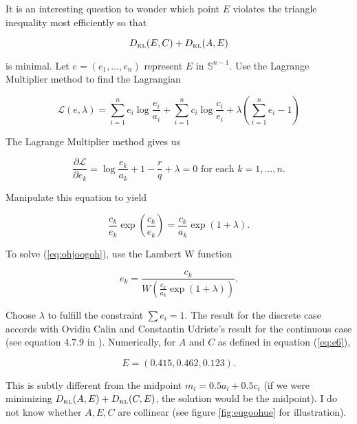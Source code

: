 \documentclass[11pt]{article}
\begin{document}
It is an interesting question to wonder which point $E$ violates the
triangle inequality most efficiently so that

\begin{equation}
  \label{eq:eaghaidu}
D_{\mbox{\tiny KL}}(E,C)+D_{\mbox{\tiny KL}}(A,E)  
\end{equation}

is minimal. Let $e=(e_{1},\ldots,e_{n})$ represent $E$ in
$\mathbb{S}^{n-1}$. Use the Lagrange Multiplier method to find the
Lagrangian

\begin{equation}
  \label{eq:eiweehee}
  \mathcal{L}(e,\lambda)=\sum_{i=1}^{n}e_{i}\log\frac{e_{i}}{a_{i}}+\sum_{i=1}^{n}c_{i}\log\frac{c_{i}}{e_{i}}+\lambda\left(\sum_{i=1}^{n}e_{i}-1\right)
\end{equation}

The Lagrange Multiplier method gives us

\begin{equation}
  \label{eq:nainguji}
  \frac{\partial\mathcal{L}}{\partial{}e_{k}}=\log\frac{e_{k}}{a_{k}}+1-\frac{r}{q}+\lambda=0\mbox{ for each }k=1,{\ldots},n.
\end{equation}

Manipulate this equation to yield

\begin{equation}
  \label{eq:ohjoogoh}
  \frac{c_{k}}{e_{k}}\exp\left(\frac{c_{k}}{e_{k}}\right)=\frac{c_{k}}{a_{k}}\exp(1+\lambda).
\end{equation}

To solve (\ref{eq:ohjoogoh}), use the Lambert W function

\begin{equation}
  \label{eq:ouquuzoh}
  e_{k}=\frac{c_{k}}{W\left(\frac{c_{k}}{a_{k}}\exp(1+\lambda)\right)}.
\end{equation}

Choose $\lambda$ to fulfill the constraint $\sum{}e_{i}=1$. The
result for the discrete case accords with Ovidiu Calin and Constantin
Udriste's result for the continuous case (see equation 4.7.9 in
). Numerically, for $A$ and $C$ as
defined in equation (\ref{eq:e6}),

\begin{equation}
  \label{eq:aemaujei}
  E=(0.415,0.462,0.123).
\end{equation}

This is subtly different from the midpoint $m_{i}=0.5a_{i}+0.5c_{i}$
(if we were minimizing
$D_{\mbox{\tiny KL}}(A,E)+D_{\mbox{\tiny KL}}(C,E)$, the solution
would be the midpoint). I do not know whether $A,E,C$ are collinear
(see figure \ref{fig:eugoohue} for illustration).
\end{document}
